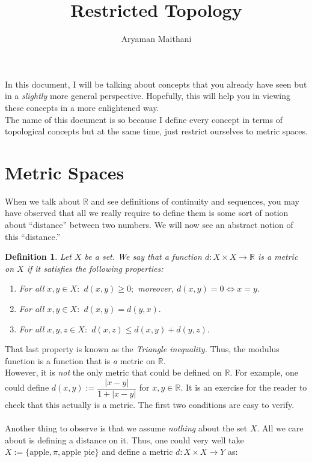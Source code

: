 \documentclass{article}
\title{Restricted Topology}
\author{Aryaman Maithani}
\date{}
\newtheorem{defn}{Definition}
\begin{document}
\maketitle
\hrulefill

In this document, I will be talking about concepts that you already have seen but in a \emph{slightly} more general perspective. Hopefully, this will help you in viewing these concepts in a more enlightened way.\\
The name of this document is so because I define every concept in terms of topological concepts but at the same time, just restrict ourselves to metric spaces.\\
\section{Metric Spaces}
	When we talk about $\mathbb{R}$ and see definitions of continuity and sequences, you may have observed that all we really require to define them is some sort of notion about ``distance'' between two numbers. We will now see an abstract notion of this ``distance.''
	\begin{defn}
		Let $X$ be a set. We say that a function $d:X\times X \to \mathbb{R}$ is a \emph{metric} on $X$ if it satisfies the following properties:
		\begin{enumerate} 
			\item For all $x, y \in X:$ $d(x, y) \ge 0;$ moreover, $d(x, y) = 0 \iff x = y.$
			\item For all $x, y \in X:$ $d(x, y) = d(y, x).$
			\item For all $x, y, z \in X:$ $d(x, z) \le d(x, y) + d(y, z).$
		\end{enumerate}
	\end{defn}
	That last property is known as the \emph{Triangle inequality.}
	Thus, the modulus function is a function that is \emph{a} metric on $\mathbb{R}.$\\
	However, it is \emph{not} the only metric that could be defined on $\mathbb{R}.$ For example, one could define $d(x, y) := \dfrac{|x-y|}{1 + |x-y|}$ for $x, y \in \mathbb{R}.$ It is an exercise for the reader to check that this actually is a metric. The first two conditions are easy to verify.\\~\\
	Another thing to observe is that we assume \emph{nothing} about the set $X.$ All we care about is defining a distance on it. Thus, one could very well take $X := \{\text{apple}, \pi, \text{apple pie}\}$ and define a metric $d:X \times X \to Y$ as:
\end{document}
